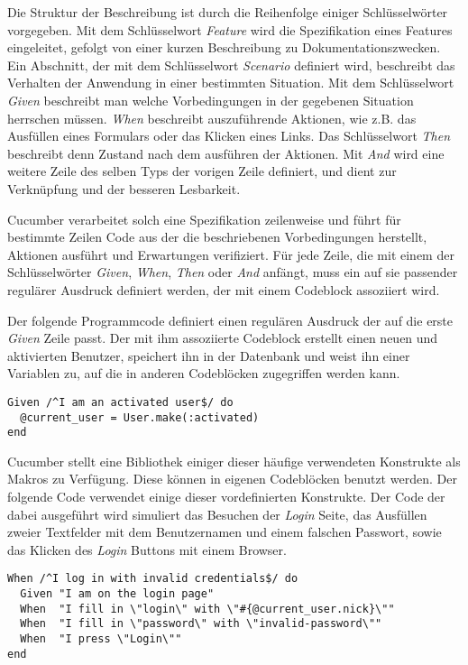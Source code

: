 Die Struktur der Beschreibung ist durch die Reihenfolge einiger
Schlüssel\-wörter vorgegeben. Mit dem Schlüsselwort \textit{Feature}
wird die Spezifikation eines Features eingeleitet, gefolgt von einer
kurzen Beschreibung zu Dokumentationszwecken. Ein Abschnitt, der mit
dem Schlüsselwort \textit{Scenario} definiert wird, beschreibt das
Verhalten der Anwendung in einer bestimmten Situation. Mit dem
Schlüsselwort \textit{Given} beschreibt man welche Vorbedingungen in
der gegebenen Situation herrschen müssen. \textit{When} beschreibt
auszuführende Aktionen, wie z.B. das Ausfüllen eines Formulars oder
das Klicken eines Links. Das Schlüsselwort \textit{Then} beschreibt
denn Zustand nach dem ausführen der Aktionen. Mit \textit{And} wird
eine weitere Zeile des selben Typs der vorigen Zeile definiert, und
dient zur Verknüpfung und der besseren Lesbarkeit.

Cucumber verarbeitet solch eine Spezifikation zeilenweise und führt
für bestimmte Zeilen Code aus der die beschriebenen Vorbedingungen
herstellt, Aktionen ausführt und Erwartungen verifiziert. Für jede
Zeile, die mit einem der Schlüsselwörter \textit{Given},
\textit{When}, \textit{Then} oder \textit{And} anfängt, muss ein auf
sie passender regulärer Ausdruck definiert werden, der mit einem
Codeblock assoziiert wird.

Der folgende Programmcode definiert einen regulären Ausdruck der auf
die erste \textit{Given} Zeile passt. Der mit ihm assoziierte Codeblock
erstellt einen neuen und aktivierten Benutzer, speichert ihn in der
Datenbank und weist ihn einer Variablen zu, auf die in anderen
Codeblöcken zugegriffen werden kann.

{\footnotesize
\begin{verbatim}
Given /^I am an activated user$/ do
  @current_user = User.make(:activated)
end
\end{verbatim}
}

Cucumber stellt eine Bibliothek einiger dieser häufige verwendeten
Konstrukte als Makros zu Verfügung. Diese können in eigenen
Codeblöcken benutzt werden. Der folgende Code verwendet einige dieser
vordefinierten Konstrukte. Der Code der dabei ausgeführt wird
simuliert das Besuchen der \textit{Login} Seite, das Ausfüllen zweier
Textfelder mit dem Benutzernamen und einem falschen Passwort, sowie
das Klicken des \textit{Login} Buttons mit einem Browser.

{\footnotesize
\begin{verbatim}
When /^I log in with invalid credentials$/ do
  Given "I am on the login page"
  When  "I fill in \"login\" with \"#{@current_user.nick}\""
  When  "I fill in \"password\" with \"invalid-password\""
  When  "I press \"Login\""
end
\end{verbatim}
}

